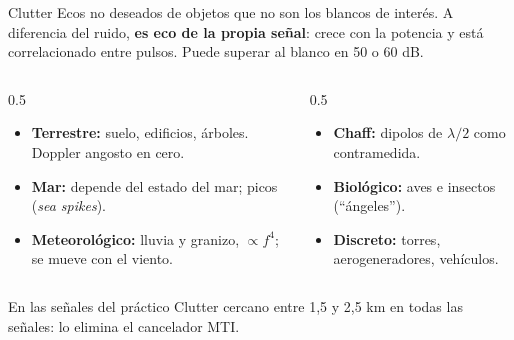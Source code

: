 \begin{frame}{Clutter}
  Ecos no deseados de objetos que no son los blancos de interés. A diferencia del ruido, \textbf{es eco de la propia señal}: crece con la potencia y está correlacionado entre pulsos. Puede superar al blanco en 50 o 60 dB.
  \vspace{0.15cm}
  \small
  \begin{columns}[T]
    \begin{column}{0.5\textwidth}
      \begin{itemize}
        \item \textbf{Terrestre:} suelo, edificios, árboles. Doppler angosto en cero.
        \item \textbf{Mar:} depende del estado del mar; picos (\textit{sea spikes}).
        \item \textbf{Meteorológico:} lluvia y granizo, $\propto f^4$; se mueve con el viento.
      \end{itemize}
    \end{column}
    \begin{column}{0.5\textwidth}
      \begin{itemize}
        \item \textbf{Chaff:} dipolos de $\lambda/2$ como contramedida.
        \item \textbf{Biológico:} aves e insectos (``ángeles'').
        \item \textbf{Discreto:} torres, aerogeneradores, vehículos.
      \end{itemize}
    \end{column}
  \end{columns}
  \vspace{0.2cm}
  \begin{block}{En las señales del práctico}
    \small Clutter cercano entre 1,5 y 2,5 km en todas las señales: lo elimina el cancelador MTI.
  \end{block}
\end{frame}

